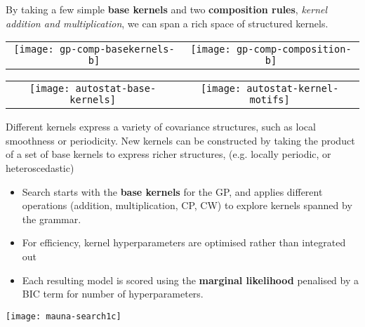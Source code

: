 
By taking a few simple {\bf base kernels} and two {\bf composition rules},
{\em kernel addition and multiplication}, we can span a rich space of
structured kernels.

\begin{tabular}{cc}
\texttt{[image: gp-comp-basekernels-b]} & 
\texttt{[image: gp-comp-composition-b]}
\end{tabular}

\centerline{}
\centerline{}



\begin{center}
\begin{tabular}{cc}
\texttt{[image: autostat-base-kernels]} & 
\texttt{[image: autostat-kernel-motifs]}
\end{tabular}
\end{center}

Different kernels express a variety of covariance
structures, such as local smoothness or periodicity. New
kernels can be constructed by taking the product of a set of
base kernels to express richer structures, (e.g. locally periodic, or
heteroscedastic) 

\begin{itemize}
\item Search starts with the {\bf base kernels} for the GP, and
  applies different operations (addition, multiplication, CP, CW) to
  explore kernels spanned by the grammar.

\item For efficiency, kernel hyperparameters are optimised rather than
integrated out

\item Each resulting model is scored using the {\bf marginal
likelihood} penalised by a BIC term for number of
hyperparameters. 
\end{itemize}


\centerline{\texttt{[image: mauna-search1c]}}


